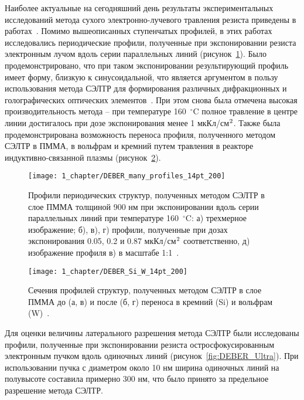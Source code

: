 Наиболее актуальные на сегодняшний день результаты экспериментальных исследований метода сухого электронно-лучевого травления резиста приведены в работах~\cite{Bruk_2015_co, Bruk_2016_mee}. Помимо вышеописанных ступенчатых профилей, в этих работах исследовались периодические профили, полученные при экспонировании резиста электронным лучом вдоль серии параллельных линий (рисунок~\ref{fig:DEBER_many_profiles}). Было продемонстрировано, что при таком экспонировании результирующий профиль имеет форму, близкую к синусоидальной, что является аргументом в пользу использования метода СЭЛТР для формирования различных дифракционных и голографических оптических элементов~\cite{Mitreska_sin_gratings}. При этом снова была отмечена высокая производительность метода -- при температуре 160~$^\circ$C полное травление в центре линии достигалось при дозе экспонирования менее 1 мкКл/см$^\text{2}$. Также была продемонстрирована возможность переноса профиля, полученного методом СЭЛТР в ПММА, в вольфрам и кремний путем травления в реакторе индуктивно-связанной плазмы (рисунок~\ref{fig:DEBER_Si_W}).

\begin{figure}[h]
	\centering
	\vspace{0.2em}
	\texttt{[image: 1\_chapter/DEBER\_many\_profiles\_14pt\_200]}
	\vspace{0.2em}
	\caption{Профили периодических структур, полученных методом СЭЛТР в слое ПММА толщиной 900 нм при экспонировании вдоль серии параллельных линий при температуре 160~$^\circ$C: а) трехмерное изображение; б), в), г) профили, полученные при дозах экспонирования 0.05, 0.2 и 0.87 мкКл/см$^\text{2}$ соответственно, д) изображение профиля в) в масштабе 1:1~\cite{Bruk_2016_mee}.}
	\label{fig:DEBER_many_profiles}
\end{figure}

\begin{figure}[t]
	\centering
	\texttt{[image: 1\_chapter/DEBER\_Si\_W\_14pt\_200]}
	\vspace{0.2em}
	\caption{Сечения профилей структур, полученных методом СЭЛТР в слое ПММА до (а, в) и после (б, г) переноса в кремний (Si) и вольфрам (W)~\cite{Bruk_2016_mee}.}
	\label{fig:DEBER_Si_W}
\end{figure}

Для оценки величины латерального разрешения метода СЭЛТР были исследованы профили, полученные при экспонировании резиста остросфокусированным электронным пучком вдоль одиночных линий (рисунок~\ref{fig:DEBER_Ultra}).
При использовании пучка с диаметром около 10 нм ширина одиночных линий на полувысоте составила примерно 300 нм, что было принято за предельное разрешение метода СЭЛТР.

